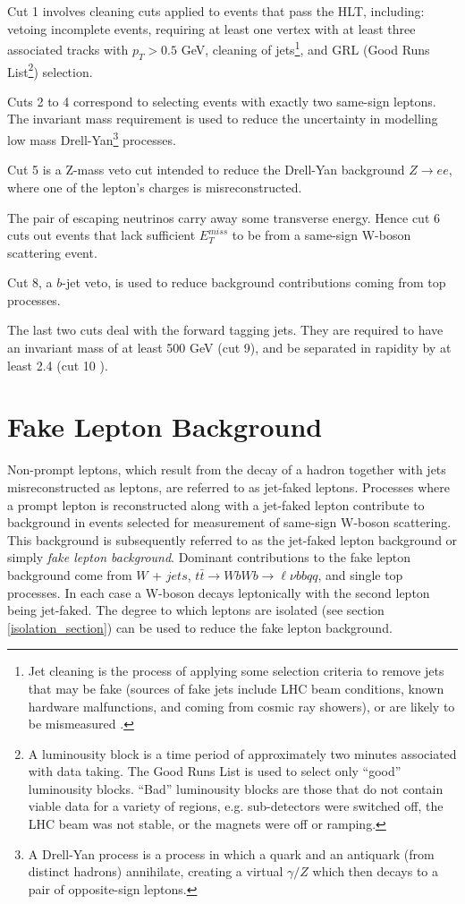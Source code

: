 Cut 1 involves cleaning cuts applied to events that pass the \textsc{HLT}, including: vetoing incomplete events, requiring at least one vertex with at least three associated tracks with $p_{T} > 0.5$ GeV, cleaning of jets\footnote{Jet cleaning is the process of applying some selection criteria to remove jets that may be fake (sources of fake jets include LHC beam conditions, known hardware malfunctions, and coming from cosmic ray showers), or are likely to be mismeasured \cite{jet_cleaning}.}, and \textsc{GRL} (Good Runs List\footnote{A luminousity block is a time period of approximately two minutes associated with data taking. The Good Runs List is used to select only ``good'' luminousity blocks. ``Bad'' luminousity blocks are those that do not contain viable data for a variety of regions, e.g. sub-detectors were switched off, the LHC beam was not stable, or the magnets were off or ramping.}) selection.

Cuts 2 to 4 correspond to selecting events with exactly two same-sign leptons. The invariant mass requirement is used to reduce the uncertainty in modelling low mass Drell-Yan\footnote{A Drell-Yan process is a process in which a quark and an antiquark (from distinct hadrons) annihilate, creating a virtual $\gamma/Z$ which then decays to a pair of opposite-sign leptons.} processes.

Cut 5 is a Z-mass veto cut intended to reduce the Drell-Yan background $Z \longrightarrow ee$, where one of the lepton's charges is misreconstructed.

The pair of escaping neutrinos carry away some transverse energy. Hence cut 6 cuts out events that lack sufficient $E_{T}^{miss}$ to be from a same-sign W-boson scattering event.

Cut 8, a $b$-jet veto, is used to reduce background contributions coming from top processes.

The last two cuts deal with the forward tagging jets. They are required to have an invariant mass of at least 500 GeV (cut 9), and be separated in rapidity by at least 2.4 (cut 10 ).
\section{Fake Lepton Background}
\label{intro_to_flb}
Non-prompt leptons, which result from the decay of a hadron together with jets misreconstructed as leptons, are referred to as jet-faked leptons. Processes where a prompt lepton is reconstructed along with a jet-faked lepton contribute to background in events selected for measurement of same-sign W-boson scattering. This background is subsequently referred to as the jet-faked lepton background or simply \emph{fake lepton background}. Dominant contributions to the fake lepton background come from $W$ + $jets$, $t\bar{t} \longrightarrow WbWb \longrightarrow \ell \nu bb qq$, and single top processes. In each case a W-boson decays leptonically with the second lepton being jet-faked. The degree to which leptons are isolated (see section \ref{isolation_section}) can be used to reduce the fake lepton background.

